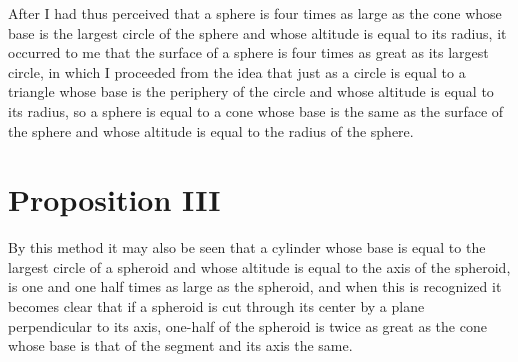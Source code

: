 \documentclass[12pt]{article}
\begin{document}
After I had thus perceived that a sphere is four times as large as the
cone whose base is the largest circle of the sphere and whose altitude
is equal to its radius, it occurred to me that the surface of a sphere
is four times as great as its largest circle, in which I proceeded
from the idea that just as a circle is equal to a triangle whose base
is the periphery of the circle and whose altitude is equal to its
radius, so a sphere is equal to a cone whose base is the same as the
surface of the sphere and whose altitude is equal to the radius of the
sphere.


\section*{Proposition III}

By this method it may also be seen that a cylinder whose base is equal
to the largest circle of a spheroid and whose altitude is equal to the
axis of the spheroid, is one and one half times as large as the
spheroid, and when this is recognized it becomes clear that if a
spheroid is cut through its center by a plane perpendicular to its
axis, one-half of the spheroid is twice as great as the cone whose
base is that of the segment and its axis the same.
\end{document}
